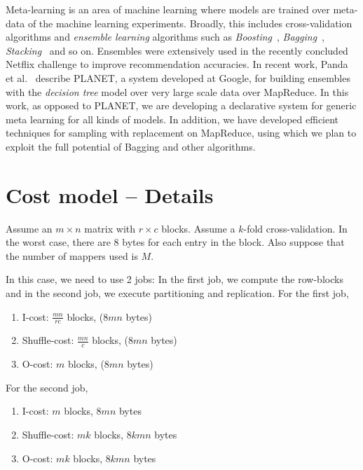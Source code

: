 \documentclass{vldb}
\newcommand{\topic}[1]{\par \smallskip \smallskip \noindent{\bf \uline{#1}}}
\newcommand{\topicnoul}[1]{\par \smallskip \smallskip \noindent{\bf {#1}}}
\begin{document}
\topic{Meta-learning:}
Meta-learning is an area of machine learning where models are trained over
meta-data of the machine learning experiments. Broadly, this includes
cross-validation algorithms and {\em ensemble learning} algorithms such as {\em
Boosting}~\cite{DBLP:journals/jcss/FreundS97}, {\em
Bagging}~\cite{springerlink:10.1007/BF00058655}, {\em
Stacking}~\cite{DBLP:journals/scholarpedia/Polikar09} and so on.
Ensembles were extensively used in the recently concluded Netflix
challenge to improve recommendation accuracies. In
recent work, Panda et al.~\cite{DBLP:journals/pvldb/PandaHBB09} describe PLANET, a system
developed at Google, for building ensembles with the {\em decision tree} model
over very large scale data over MapReduce. In this work, as opposed to PLANET, we are developing a
declarative system for generic meta learning for all kinds of models. In
addition, we have developed efficient techniques for sampling with replacement on
MapReduce, using which we plan to exploit the full potential of Bagging and
other algorithms.


{
\small
}

\appendix





\section{Cost model -- Details}
Assume an $m \times n$ matrix with $r\times c$ blocks. Assume a $k$-fold
cross-validation. In the worst case, there are 8 bytes for each entry in the
block. Also suppose that the number of mappers used is $M$.

\topicnoul{Using reblock:}
In this case, we need to use 2 jobs: In the first job, we compute the row-blocks
and in the second job, we execute partitioning and replication. For the first
job,
\begin{enumerate}
\item I-cost: $\frac{mn}{rc}$ blocks, ($8mn$ bytes)
\item Shuffle-cost: $\frac{mn}{c}$ blocks, ($8mn$ bytes)
\item O-cost: $m$ blocks, ($8mn$ bytes)
\end{enumerate}

\noindent For the second job,
\begin{enumerate}
\item I-cost: $m$ blocks, $8mn$ bytes
\item Shuffle-cost: $mk$ blocks, $8kmn$ bytes
\item O-cost: $mk$ blocks, $8kmn$ bytes
\end{enumerate}
\end{document}
